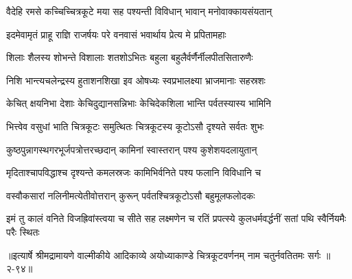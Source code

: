 \twolineshloka
{वैदेहि रमसे कच्चिच्चित्रकूटे मया सह}
{पश्यन्ती विविधान् भावान् मनोवाक्कायसंयतान्} %

\twolineshloka
{इदमेवामृतं प्राहू राज्ञि राजर्षयः परे}
{वनवासं भवार्थाय प्रेत्य मे प्रपितामहाः} %

\twolineshloka
{शिलाः शैलस्य शोभन्ते विशालाः शतशोऽभितः}
{बहुला बहुलैर्वर्णैर्नीलपीतसितारुणैः} %

\twolineshloka
{निशि भान्त्यचलेन्द्रस्य हुताशनशिखा इव}
{ओषध्यः स्वप्रभालक्ष्या भ्राजमानाः सहस्रशः} %

\twolineshloka
{केचित् क्षयनिभा देशाः केचिदुद्यानसन्निभाः}
{केचिदेकशिला भान्ति पर्वतस्यास्य भामिनि} %

\twolineshloka
{भित्त्वेव वसुधां भाति चित्रकूटः समुत्थितः}
{चित्रकूटस्य कूटोऽसौ दृश्यते सर्वतः शुभः} %

\twolineshloka
{कुष्ठपुन्नागस्थगरभूर्जपत्रोत्तरच्छदान्}
{कामिनां स्वास्तरान् पश्य कुशेशयदलायुतान्} %

\twolineshloka
{मृदिताश्चापविद्धाश्च दृश्यन्ते कमलस्रजः}
{कामिभिर्वनिते पश्य फलानि विविधानि च} %

\twolineshloka
{वस्वौकसारां नलिनीमत्येतीवोत्तरान् कुरून्}
{पर्वतश्चित्रकूटोऽसौ बहुमूलफलोदकः} %

\twolineshloka
{इमं तु कालं वनिते विजह्रिवांस्त्वया च सीते सह लक्ष्मणेन च}
{रतिं प्रपत्स्ये कुलधर्मवर्द्धनीं सतां पथि स्वैर्नियमैः परैः स्थितः} %


॥इत्यार्षे श्रीमद्रामायणे वाल्मीकीये आदिकाव्ये अयोध्याकाण्डे चित्रकूटवर्णनम् नाम चतुर्नवतितमः सर्गः ॥२-९४॥
